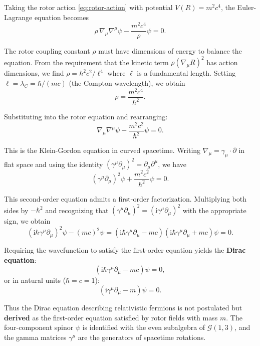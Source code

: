 \documentclass[11pt,a4paper]{article}
\numberwithin{equation}{section}
\theoremstyle{plain}
\theoremstyle{definition}
\theoremstyle{remark}
\newcommand{\ii}{\mathrm{i}}
\begin{document}
Taking the rotor action \eqref{eq:rotor-action} with potential $V(R) = m^2c^4$, the Euler-Lagrange equation becomes
\begin{equation}
\rho\, \nabla_\mu \nabla^\mu \psi - \frac{m^2c^4}{\rho}\psi = 0.
\end{equation}

The rotor coupling constant $\rho$ must have dimensions of energy to balance the equation. From the requirement that the kinetic term $\rho (\nabla_\mu R)^2$ has action dimensions, we find $\rho = \hbar^2 c^2/\ell^4$ where $\ell$ is a fundamental length. Setting $\ell = \lambda_C = \hbar/(mc)$ (the Compton wavelength), we obtain
\begin{equation}
\rho = \frac{m^2c^4}{\hbar^2}.
\end{equation}

Substituting into the rotor equation and rearranging:
\begin{equation}
\nabla_\mu \nabla^\mu \psi - \frac{m^2c^2}{\hbar^2}\psi = 0.
\end{equation}

This is the Klein-Gordon equation in curved spacetime. Writing $\nabla_\mu = \gamma_\mu \cdot \partial$ in flat space and using the identity $(\gamma^\mu \partial_\mu)^2 = \partial_\mu \partial^\mu$, we have
\begin{equation}
(\gamma^\mu \partial_\mu)^2 \psi + \frac{m^2c^2}{\hbar^2}\psi = 0.
\end{equation}

This second-order equation admits a first-order factorization. Multiplying both sides by $-\hbar^2$ and recognizing that $(\gamma^\mu \partial_\mu)^2 = (\ii\gamma^\mu \partial_\mu)^2$ with the appropriate sign, we obtain
\begin{equation}
(\ii\hbar\gamma^\mu \partial_\mu)^2\psi - (mc)^2\psi = (\ii\hbar\gamma^\mu \partial_\mu - mc)(\ii\hbar\gamma^\mu \partial_\mu + mc)\psi = 0.
\end{equation}

Requiring the wavefunction to satisfy the first-order equation yields the \textbf{Dirac equation}:
\begin{equation}
(\ii\hbar\gamma^\mu \partial_\mu - mc)\psi = 0,
\label{eq:dirac}
\end{equation}
or in natural units ($\hbar = c = 1$):
\begin{equation}
(\ii\gamma^\mu \partial_\mu - m)\psi = 0.
\end{equation}

Thus the Dirac equation describing relativistic fermions is not postulated but \textbf{derived} as the first-order equation satisfied by rotor fields with mass $m$. The four-component spinor $\psi$ is identified with the even subalgebra of $\mathcal{G}(1,3)$, and the gamma matrices $\gamma^\mu$ are the generators of spacetime rotations.
\end{document}
